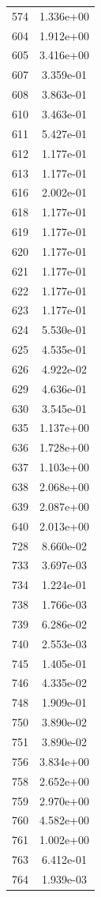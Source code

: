 \documentclass[12pt]{article}
\begin{document}
\begin{longtable}{@{}cc@{}}
574 & 1.336e+00 \\
604 & 1.912e+00 \\
605 & 3.416e+00 \\
607 & 3.359e-01 \\
608 & 3.863e-01 \\
610 & 3.463e-01 \\
611 & 5.427e-01 \\
612 & 1.177e-01 \\
613 & 1.177e-01 \\
616 & 2.002e-01 \\
618 & 1.177e-01 \\
619 & 1.177e-01 \\
620 & 1.177e-01 \\
621 & 1.177e-01 \\
622 & 1.177e-01 \\
623 & 1.177e-01 \\
624 & 5.530e-01 \\
625 & 4.535e-01 \\
626 & 4.922e-02 \\
629 & 4.636e-01 \\
630 & 3.545e-01 \\
635 & 1.137e+00 \\
636 & 1.728e+00 \\
637 & 1.103e+00 \\
638 & 2.068e+00 \\
639 & 2.087e+00 \\
640 & 2.013e+00 \\
728 & 8.660e-02 \\
733 & 3.697e-03 \\
734 & 1.224e-01 \\
738 & 1.766e-03 \\
739 & 6.286e-02 \\
740 & 2.553e-03 \\
745 & 1.405e-01 \\
746 & 4.335e-02 \\
748 & 1.909e-01 \\
750 & 3.890e-02 \\
751 & 3.890e-02 \\
756 & 3.834e+00 \\
758 & 2.652e+00 \\
759 & 2.970e+00 \\
760 & 4.582e+00 \\
761 & 1.002e+00 \\
763 & 6.412e-01 \\
764 & 1.939e-03 \\

\end{longtable}
\end{document}
